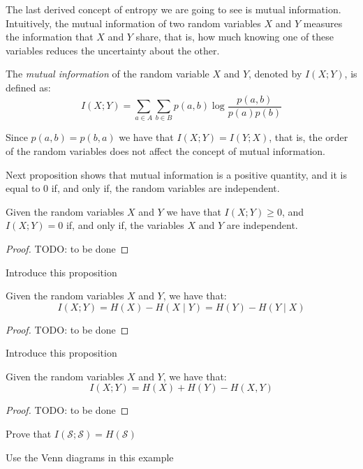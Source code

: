 The last derived concept of entropy we are going to see is mutual information. Intuitively, the mutual information of two random variables $X$ and $Y$ measures the information that $X$ and $Y$ share, that is, how much knowing one of these variables reduces the uncertainty about the other.

\begin{definition}
The \emph{mutual information} of the random variable $X$ and $Y$, denoted by $I(X ; Y)$, is defined as:
\[
I(X ; Y) = \sum_{a \in A} \sum_{b \in B} p(a, b) \log \frac{p(a, b)}{p(a) p(b)}
\]
\end{definition}

Since $p(a, b) = p(b, a)$ we have that $I(X ; Y) = I(Y ; X)$, that is, the order of the random variables does not affect the concept of mutual information.

Next proposition shows that mutual information is a positive quantity, and it is equal to 0 if, and only if, the random variables are independent.

\begin{proposition}
Given the random variables $X$ and $Y$ we have that $I(X ; Y) \geq 0$, and $I(X ; Y) = 0$ if, and only if, the variables $X$ and $Y$ are independent.
\end{proposition}
\begin{proof}
{\color{red} TODO: to be done}
\end{proof}

{\color{red} Introduce this proposition}

\begin{proposition}
Given the random variables $X$ and $Y$, we have that:
\[
I(X;Y) = H(X) - H(X \mid Y) = H(Y) - H(Y \mid X)
\]
\end{proposition}
\begin{proof}
{\color{red} TODO: to be done}
\end{proof}

{\color{red} Introduce this proposition}

\begin{proposition}
Given the random variables $X$ and $Y$, we have that:
\[
I(X;Y) = H(X) + H(Y) - H(X, Y)
\]
\end{proposition}
\begin{proof}
{\color{red} TODO: to be done}
\end{proof}

{\color{red} Prove that $I(\mathcal{S}; \mathcal{S}) = H(\mathcal{S})$}

{\color{red} Use the Venn diagrams in this example}


